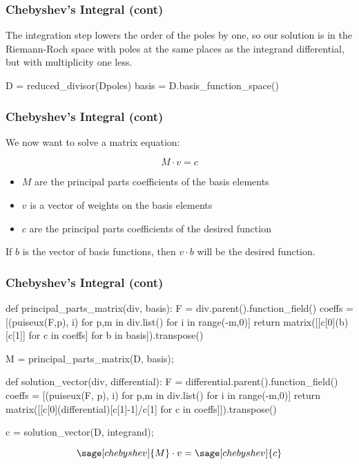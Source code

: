 \documentclass[aspectratio=169,dvipsnames]{beamer}
\begin{document}
\begin{frame}[fragile]
\frametitle{Chebyshev's Integral (cont)}

The integration step lowers the order of the poles by one, so our
solution is in the Riemann-Roch space with poles at the same places as
the integrand differential, but with multiplicity one less.

\begin{sageblock}[chebyshev]
D = reduced_divisor(Dpoles)
basis = D.basis_function_space()
\end{sageblock}

\end{frame}

\begin{frame}[fragile]
\frametitle{Chebyshev's Integral (cont)}

We now want to solve a matrix equation:

$$M \cdot v = c$$

\begin{itemize}
\item $M$ are the principal parts coefficients of the basis elements
\item $v$ is a vector of weights on the basis elements
\item $c$ are the principal parts coefficients of the desired function
\end{itemize}

If $b$ is the vector of basis functions, then $v\cdot b$ will be the desired function.

\end{frame}

\begin{frame}[fragile]
\frametitle{Chebyshev's Integral (cont)}

\begin{sageblock}[chebyshev]
def principal_parts_matrix(div, basis):
    F = div.parent().function_field()
    coeffs = [(puiseux(F,p), i) for p,m in div.list() for i in range(-m,0)]
    return matrix([[c[0](b)[c[1]] for c in coeffs] for b in basis]).transpose()

M = principal_parts_matrix(D, basis);

def solution_vector(div, differential):
    F = differential.parent().function_field()
    coeffs = [(puiseux(F, p), i) for p,m in div.list() for i in range(-m,0)]
    return matrix([[c[0](differential)[c[1]-1]/c[1] for c in coeffs]]).transpose()

c = solution_vector(D, integrand);
\end{sageblock}

\bigskip
\tiny
\[ \sage[chebyshev]{M} \cdot v = \sage[chebyshev]{c} \]

\end{frame}
\end{document}
